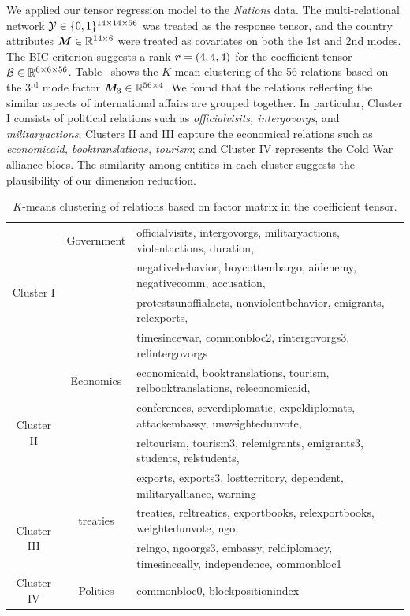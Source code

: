 \documentclass[12pt]{article}
\theoremstyle{plain}
\theoremstyle{definition}
\begin{document}
We applied our tensor regression model to the \emph{Nations} data. The multi-relational network $\mathcal{Y}\in\{0,1\}^{14\times 14\times 56}$ was treated as the response tensor, and the country attributes $\bm M\in\mathbb{R}^{14\times 6}$ were treated as covariates on both the 1st and 2nd modes. The BIC criterion suggests a rank $\bm{r}=(4,4,4)$ for the coefficient tensor $\mathcal{B}\in\mathbb{R}^{6\times 6 \times 56}$. Table~ shows the $K$-mean clustering of the 56 relations based on the 3$^\text{rd}$ mode factor $\bm M_3\in\mathbb{R}^{56\times 4}$. We found that the relations reflecting the similar aspects of international affairs are grouped together. In particular, Cluster I consists of political relations such as \emph{officialvisits, intergovorgs}, and \emph{militaryactions}; Clusters II and III capture the economical relations such as \emph{economicaid, booktranslations, tourism}; and Cluster IV represents the Cold War alliance blocs. The similarity among entities in each cluster suggests the plausibility of our dimension reduction. 



\begin{table}[H]
\begin{tabular}{c|c|l}
\hline
\multirow{4}{*}{Cluster I}  & Government &officialvisits, intergovorgs,  militaryactions, violentactions, duration, \\
&&negativebehavior, boycottembargo, aidenemy, negativecomm, accusation, \\
& &protestsunoffialacts,    nonviolentbehavior, emigrants, relexports,   \\
& &timesincewar, commonbloc2, rintergovorgs3, relintergovorgs\\
\hline
\multirow{4}{*}{Cluster II}& Economics &economicaid, booktranslations, tourism, relbooktranslations, releconomicaid, \\
&& conferences, severdiplomatic, expeldiplomats, attackembassy, unweightedunvote,\\
&& reltourism, tourism3, relemigrants, emigrants3, students, relstudents, \\
&&exports, exports3, lostterritory, dependent, militaryalliance, warning  \\
\hline
\multirow{2}{*}{Cluster III} & treaties &treaties, reltreaties, exportbooks, relexportbooks, weightedunvote, ngo, \\
&&relngo, ngoorgs3, embassy, reldiplomacy, timesinceally, independence, commonbloc1\\
\hline
Cluster IV & Politics &commonbloc0, blockpositionindex\\
\end{tabular}
\caption{$K$-means clustering of relations based on factor matrix in the coefficient tensor.}\label{tab:s1}
\end{table}
\end{document}
